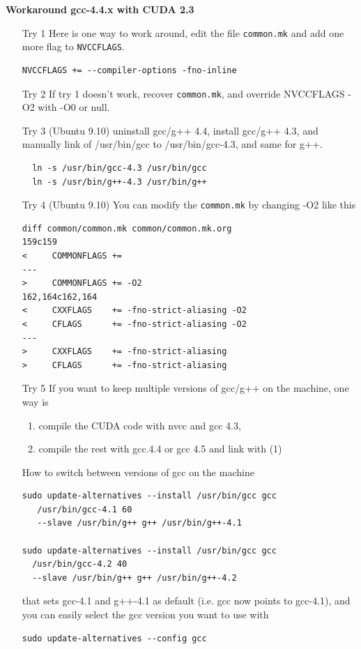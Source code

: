 {\bf Workaround gcc-4.4.x with CUDA 2.3}
\begin{enumerate}
\item [Try 1] Here is one way to work around, edit the file
  \verb!common.mk!  and add one more flag to \verb!NVCCFLAGS!.
\begin{verbatim}
NVCCFLAGS += --compiler-options -fno-inline
\end{verbatim}

\item [Try 2] If try 1 doesn't work, recover \verb!common.mk!, and
  override NVCCFLAGS -O2 with -O0 or null.

\item [Try 3] (Ubuntu 9.10) uninstall gcc/g++ 4.4, install gcc/g++
  4.3, and manually link of /usr/bin/gcc to /usr/bin/gcc-4.3, and same
  for g++.
  \begin{verbatim}
  ln -s /usr/bin/gcc-4.3 /usr/bin/gcc
  ln -s /usr/bin/g++-4.3 /usr/bin/g++
  \end{verbatim}

\item [Try 4] (Ubuntu 9.10) You can modify the \verb!common.mk! by
  changing -O2 like this
\begin{verbatim}
diff common/common.mk common/common.mk.org
159c159
<     COMMONFLAGS +=
---
>     COMMONFLAGS += -O2
162,164c162,164
<     CXXFLAGS    += -fno-strict-aliasing -O2
<     CFLAGS      += -fno-strict-aliasing -O2
---
>     CXXFLAGS    += -fno-strict-aliasing
>     CFLAGS      += -fno-strict-aliasing
\end{verbatim}

\item [Try 5] If you want to keep multiple versions of gcc/g++ on the machine,
  one way is
  \begin{enumerate}
  \item compile the CUDA code with nvcc and gcc 4.3,
  \item compile the rest with gcc.4.4 or gcc 4.5 and link with (1)
  \end{enumerate}

  How to switch between versions of gcc on the machine
\begin{verbatim}
sudo update-alternatives --install /usr/bin/gcc gcc 
   /usr/bin/gcc-4.1 60 
   --slave /usr/bin/g++ g++ /usr/bin/g++-4.1

sudo update-alternatives --install /usr/bin/gcc gcc 
  /usr/bin/gcc-4.2 40 
  --slave /usr/bin/g++ g++ /usr/bin/g++-4.2
\end{verbatim}
  that sets gcc-4.1 and g++-4.1 as default (i.e. gcc now points to
  gcc-4.1), and you can easily select the gcc version you want to use with
\begin{verbatim}
sudo update-alternatives --config gcc
\end{verbatim}
\end{enumerate}


